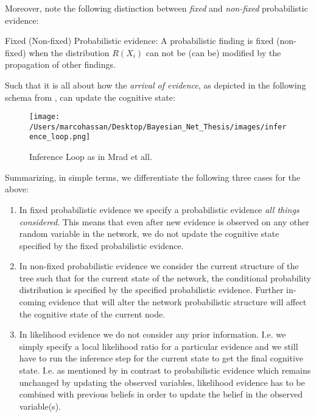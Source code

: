 \documentclass[11pt]{article}
\begin{document}
\begin{article}
Moreover, note the following distinction between \emph{fixed} and
\emph{non-fixed} probabilistic evidence:

\begin{definition}
Fixed (Non-fixed) Probabilistic evidence: A probabilistic finding
is fixed (non-fixed) when the distribution $R(X_i)$ can not be (can
be) modified by the propagation of other findings.
\end{definition}  

Such that it is all about how the \emph{arrival of evidence}, as depicted
in the following schema from \cite{Mrad_2015}, can update the
cognitive state:

\begin{figure}[htbp]
\centering
\texttt{[image: /Users/marcohassan/Desktop/Bayesian\_Net\_Thesis/images/inference\_loop.png]}
\caption{Inference Loop as in Mrad et all.}
\end{figure}


Summarizing, in simple terms, we differentiate the following three
cases for the above:

\begin{enumerate}
\item In fixed probabilistic evidence we specify a probabilistic evidence \emph{all things
considered}. This means that even after new evidence is observed
on any other random variable in the network, we do not update the
cognitive state specified by the fixed probabilistic evidence.

\item In non-fixed probabilistic evidence we consider the current
structure of the tree such that for the current state of the
network, the conditional probability distribution is specified by
the specified probabilistic evidence. Further in-coming evidence
that will alter the network probabilistic structure will affect
the cognitive state of the current node.

\item In likelihood evidence we do not consider any prior
information. I.e. we simply specify a local likelihood ratio for
a particular evidence and we still have to run the inference step
for the current state to get the final cognitive state. I.e. as
mentioned by \cite{Mrad_2015} in contrast to probabilistic evidence
which remains unchanged by updating the observed variables,
likelihood evidence has to be combined with previous beliefs in
order to update the belief in the observed variable(s).
\end{enumerate}


\end{article}
\end{document}
